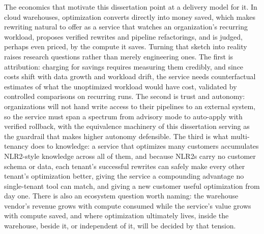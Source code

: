 The economics that motivate this dissertation point at a delivery
model for it. In cloud warehouses, optimization converts directly
into money saved, which makes rewriting natural to offer as a
service that watches an organization's recurring workload, proposes
verified rewrites and pipeline refactorings, and is judged, perhaps
even priced, by the compute it saves. Turning that sketch into
reality raises research questions rather than merely engineering
ones. The first is attribution: charging for savings requires
measuring them credibly, and since costs shift with data growth and
workload drift, the service needs counterfactual estimates of what
the unoptimized workload would have cost, validated by controlled
comparisons on recurring runs. The second is trust and autonomy:
organizations will not hand write access to their pipelines to an
external system, so the service must span a spectrum from advisory
mode to auto-apply with verified rollback, with the equivalence
machinery of this dissertation serving as the guardrail that makes
higher autonomy defensible. The third is what multi-tenancy does to
knowledge: a service that optimizes many customers accumulates
NLR2-style knowledge across all of them, and because NLR2s carry no
customer schema or data, each tenant's successful rewrites can
safely make every other tenant's optimization better, giving the
service a compounding advantage no single-tenant tool can match, and
giving a new customer useful optimization from day one. There is
also an ecosystem question worth naming: the warehouse vendor's
revenue grows with compute consumed while the service's value grows
with compute saved, and where optimization ultimately lives, inside
the warehouse, beside it, or independent of it, will be decided by
that tension.